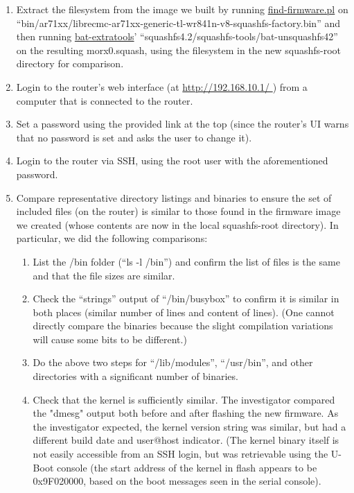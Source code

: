 \begin{enumerate}
  
\item Extract the filesystem from the image we built by running
  \href{https://gitorious.org/copyleft-org/gpl-compliance-scripts/source/master:find-firmware.pl}{find-firmware.pl}
  on ``bin/ar71xx/librecmc-ar71xx-generic-tl-wr841n-v8-squashfs-factory.bin''
  and then running
  \href{http://www.binaryanalysis.org/en/content/show/download}{bat-extratools}'
  ``squashfs4.2/squashfs-tools/bat-unsquashfs42'' on the resulting
  morx0.squash, using the filesystem in the new squashfs-root directory for
  comparison.

\item Login to the router's web interface (at \url{http://192.168.10.1/ }) from a computer that is
  connected to the router.
  
\item Set a password using the provided link at the top (since the router's
  UI warns that no password is set and asks the user to change it).
  
\item Login to the router via SSH, using the root user with the
  aforementioned password.
  
\item Compare representative directory listings and binaries to ensure the set of
  included files (on the router) is similar to those found in the firmware image
  we created (whose contents are now in the local squashfs-root directory).  In
  particular, we did the following comparisons:

  \begin{enumerate}
  \item List the /bin folder (``ls -l /bin'') and confirm the list of files is the same
    and that the file sizes are similar.
    
  \item Check the ``strings'' output of ``/bin/busybox'' to confirm it is similar in both
   places (similar number of lines and content of lines).  (One cannot directly
   compare the binaries because the slight compilation variations will cause
   some bits to be different.)
 \item Do the above two steps for ``/lib/modules'', ``/usr/bin'', and other directories with
   a significant number of binaries.
   
 \item Check that the kernel is sufficiently similar.  The investigator
   compared the "dmesg" output both before and after flashing the new
   firmware.  As the investigator expected, the kernel version string was
   similar, but had a different build date and user@host indicator.  (The
   kernel binary itself is not easily accessible from an SSH login, but was
   retrievable using the U-Boot console (the start address of the kernel in
   flash appears to be 0x9F020000, based on the boot messages seen in the
   serial console).
  \end{enumerate}
\end{enumerate}

